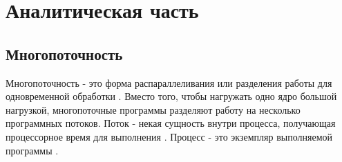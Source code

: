 \chapter{Аналитическая часть}

\section{Многопоточность}

Многопоточность - это форма распараллеливания или разделения работы для одновременной обработки \cite{intel-multithreading}. Вместо того, чтобы нагружать одно ядро большой нагрузкой, многопоточные программы разделяют работу на несколько программных потоков. Поток - некая сущность внутри процесса, получающая процессорное время для выполнения \cite{thread}. Процесс - это экземпляр выполняемой программы \cite{winForProf}.